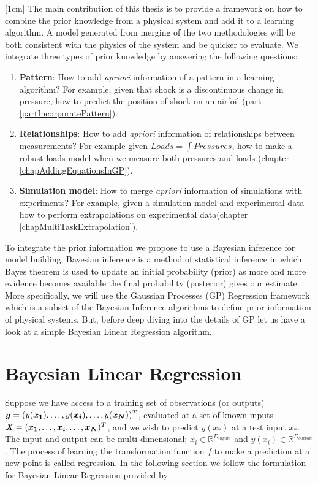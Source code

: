 \begin{mdframed}[hidealllines=true,backgroundcolor=blue!20]
[1cm]
The main contribution of this thesis is to provide a framework on how to combine the prior knowledge from a physical system and add it to a learning algorithm. A model generated from merging of the two methodologies will be both consistent with the physics of the system and be quicker to evaluate. We integrate three types of prior knowledge by answering the following questions:
\begin{enumerate}
\item \textbf{Pattern}: How to add \textit{apriori} information of a pattern in a learning algorithm? For example, given that shock is a discontinuous change in pressure, how to predict the position of shock on an airfoil (part \ref{partIncorporatePattern}). 
\item \textbf{Relationships}: How to add \textit{apriori} information of relationships between measurements? For example given $Loads = \int Pressures$, how to make a robust loads model when we measure both pressures and loads (chapter \ref{chapAddingEquationsInGP}).
\item \textbf{Simulation model}: How to merge \textit{apriori} information of simulations with experiments? For example, given a simulation model and experimental data how to perform extrapolations on experimental data(chapter \ref{chapMultiTaskExtrapolation}). 
\end{enumerate}

To integrate the prior information we propose to use a Bayesian inference for model building. Bayesian inference is a method of statistical inference in which Bayes theorem is used to update an initial probability (prior) as more and more evidence becomes available the final probability (posterior) gives our estimate. More specifically, we will use the Gaussian Processes (GP) Regression framework which is a subset of the Bayesian Inference algorithms to define prior information of physical systems. But, before deep diving into the details of GP let us have a look at a simple Bayesian Linear Regression algorithm.
\end{mdframed}

\section{Bayesian Linear Regression}\label{secBayesianModelling}
\sloppy Suppose we have access to a training set of observations (or outputs) $\boldsymbol{y} = (y(\boldsymbol{x_{1}}), \ldots , y(\boldsymbol{x_{i}}), \ldots , y(\boldsymbol{x_{N}}))^T$, evaluated at a set of known inputs $\bm{\mathit{X}} = (\boldsymbol{x_{1}}, \ldots , \boldsymbol{x_{i}}, \ldots, \boldsymbol{x_{N}})^T$, and we wish to predict $y(x_{*})$ at a test input $x_{*}$. The input and output can be multi-dimensional; $x_{i} \in \mathbb{R}^{D_{inputs}}$ and $y(x_{i}) \in \mathbb{R}^{D_{outputs}}$. The process of learning the transformation function $f$ to make a prediction at a new point is called regression. In the following section we follow the formulation for Bayesian Linear Regression provided by \cite{mackay2003information}.

